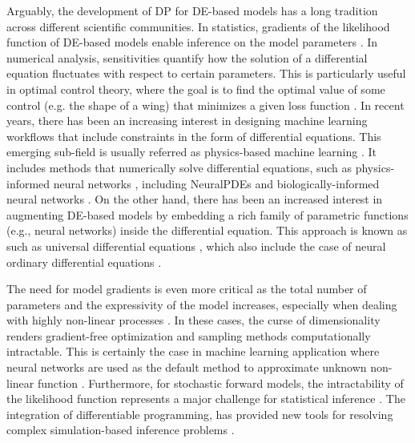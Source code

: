 Arguably, the development of DP for DE-based models has a long tradition across different scientific communities.
In statistics, gradients of the likelihood function of DE-based models enable inference on the model parameters \cite{ramsay2017dynamic}. 
In numerical analysis, sensitivities quantify how the solution of a differential equation fluctuates with respect to certain parameters. 
This is particularly useful in optimal control theory, where the goal is to find the optimal value of some control (e.g. the shape of a wing) that minimizes a given loss function \cite{Giles_Pierce_2000}. 
In recent years, there has been an increasing interest in designing machine learning workflows that include constraints in the form of differential equations.
This emerging sub-field is usually referred as physics-based machine learning \cite{Karniadakis_Kevrekidis_Lu_Perdikaris_Wang_Yang_2021, thuerey2021pbdl}.
It includes methods that numerically solve differential equations, such as physics-informed neural networks \cite{PINNs_2019}, including NeuralPDEs \cite{Zubov_McCarthy_Ma_Calisto_Pagliarino_Azeglio_Bottero_Luján_Sulzer_Bharambe_et} and biologically-informed neural networks \cite{Lagergren_Nardini_Baker_Simpson_Flores_2020}. 
On the other hand, there has been an increased interest in augmenting DE-based models by embedding a rich family of parametric functions (e.g., neural networks) inside the differential equation.  
This approach is known as such as universal differential equations \cite{rackauckas2020universal, Dandekar_2020}, which also include the case of neural ordinary differential equations \cite{chen_neural_2019}.

The need for model gradients is even more critical as the total number of parameters and the expressivity of the model increases, especially when dealing with highly non-linear processes \cite{Karniadakis_Kevrekidis_Lu_Perdikaris_Wang_Yang_2021}.
In these cases, the curse of dimensionality renders gradient-free optimization and sampling methods computationally intractable. 
This is certainly the case in machine learning application where neural networks are used as the default method to approximate unknown non-linear function \cite{LeCun2015}. 
Furthermore, for stochastic forward models, the intractability of the likelihood function represents a major challenge for statistical inference \cite{Cranmer_Brehmer_Louppe_2020}.
The integration of differentiable programming, has provided new tools for resolving complex simulation-based inference problems \cite{Cranmer_Brehmer_Louppe_2020}.

